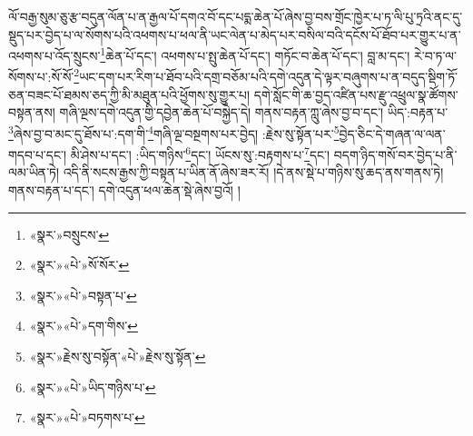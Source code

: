 ལོ་བརྒྱ་སུམ་ཅུ་རྩ་བདུན་ལོན་པ་ན་རྒྱལ་པོ་དགའ་བོ་དང་པདྨ་ཆེན་པོ་ཞེས་བྱ་བས་གྲོང་ཁྱེར་པ་ཏ་ལི་པུ་ཏྲའི་ནང་དུ་སྡུད་པར་བྱེད་པ་ལ་སོགས་པའི་འཕགས་པ་ཕལ་ནི་ཡང་ལེན་པ་མེད་པར་བསིལ་བའི་དངོས་པོ་ཐོབ་པར་གྱུར་པ་ན་འཕགས་པ་འོད་སྲུངས་\footnote{«སྣར་»བསྲུངས་}ཆེན་པོ་དང་། འཕགས་པ་སྤུ་ཆེན་པོ་དང་། གཏོང་བ་ཆེན་པོ་དང་། བླ་མ་དང་། རེ་བ་ཏ་ལ་སོགས་པ་:སོ་སོ་\footnote{«སྣར་»«པེ་»སོ་སོར་}ཡང་དག་པར་རིག་པ་ཐོབ་པའི་དགྲ་བཅོམ་པའི་དགེ་འདུན་དེ་ལྟར་བཞུགས་པ་ན་བདུད་སྡིག་ཏོ་ཅན་བཟང་པོ་ཐམས་ཅད་ཀྱི་མི་མཐུན་པའི་ཕྱོགས་སུ་གྱུར་པ། དགེ་སློང་གི་ཆ་བྱད་འཛིན་པས་རྫུ་འཕྲུལ་སྣ་ཚོགས་བསྟན་ནས། གཞི་ལྔས་དགེ་འདུན་གྱི་དབྱེན་ཆེན་པོ་བསྐྱེད་དེ། གནས་བརྟན་ཀླུ་ཞེས་བྱ་བ་དང་། ཡིད་:བརྟན་པ་\footnote{«སྣར་»«པེ་»བསྟན་པ་}ཞེས་བྱ་བ་མང་དུ་ཐོས་པ་:དག་གི་\footnote{«སྣར་»«པེ་»དག་གིས་}གཞི་ལྔ་བསྔགས་པར་བྱེད། :རྗེས་སུ་སྟོན་པར་\footnote{«སྣར་»རྗེས་སུ་བསྟོན་«པེ་»རྗེས་སུ་སྟོན་}བྱེད་ཅིང་དེ་གཞན་ལ་ལན་གདབ་པ་དང་། མི་ཤེས་པ་དང་། :ཡིད་གཉིས་\footnote{«སྣར་»«པེ་»ཡིད་གཉིས་པ་}དང་། ཡོངས་སུ་:བརྟགས་པ་\footnote{«སྣར་»«པེ་»བཏགས་པ་}དང་། བདག་ཉིད་གསོ་བར་བྱེད་པ་ནི་ལམ་ཡིན་ཏེ། འདི་ནི་སངས་རྒྱས་ཀྱི་བསྟན་པ་ཡིན་ནོ་ཞེས་ཟར་རོ། །དེ་ནས་སྡེ་པ་གཉིས་སུ་ཆད་ནས་གནས་ཏེ། གནས་བརྟན་པ་དང་། དགེ་འདུན་ཕལ་ཆེན་སྡེ་ཞེས་བྱའོ། །
